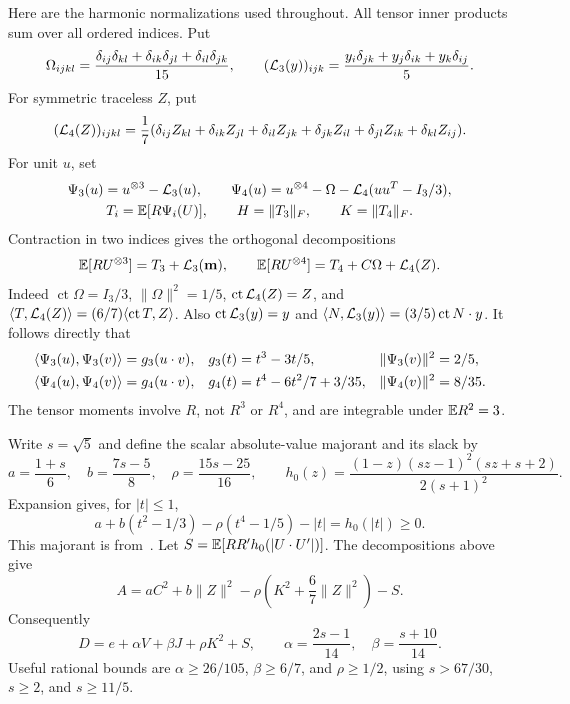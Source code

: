 Here are the harmonic normalizations used throughout. All tensor inner
products sum over all ordered indices. Put
\[
 \Omega_{ijkl}=\frac{\delta_{ij}\delta_{kl}+\delta_{ik}\delta_{jl}
                           +\delta_{il}\delta_{jk}}{15},
 \qquad
 ({\cal L}_3(y))_{ijk}
       =\frac{y_i\delta_{jk}+y_j\delta_{ik}+y_k\delta_{ij}}5.
\]
For symmetric traceless $Z$, put
\[
 ({\cal L}_4(Z))_{ijkl}=\frac17(\delta_{ij}Z_{kl}+\delta_{ik}Z_{jl}
 +\delta_{il}Z_{jk}+\delta_{jk}Z_{il}+\delta_{jl}Z_{ik}+\delta_{kl}Z_{ij}).
\]
For unit $u$, set
\[
 \begin{gathered}
 \Psi_3(u)=u^{\otimes3}-{\cal L}_3(u),\qquad
 \Psi_4(u)=u^{\otimes4}-\Omega-{\cal L}_4(uu^T-I_3/3),\\
 T_i=\mathbb E[R\Psi_i(U)],\qquad H=\|T_3\|_F,\qquad K=\|T_4\|_F.
 \end{gathered}
\]
Contraction in two indices gives the orthogonal decompositions
\[
 \mathbb E[R U^{\otimes3}]=T_3+{\cal L}_3(\mathbf m),\qquad
 \mathbb E[R U^{\otimes4}]=T_4+C\Omega+{\cal L}_4(Z).
\]
Indeed $\operatorname{ct}\Omega=I_3/3$, $\|\Omega\|^2=1/5$,
$\operatorname{ct}{\cal L}_4(Z)=Z$, and
$\langle T,{\cal L}_4(Z)\rangle=(6/7)\langle\operatorname{ct}T,Z\rangle$.
Also $\operatorname{ct}{\cal L}_3(y)=y$ and
$\langle N,{\cal L}_3(y)\rangle=(3/5)\operatorname{ct}N\cdot y$.
It follows directly that
\begin{align}\label{harmonics}
 \langle\Psi_3(u),\Psi_3(v)\rangle&=g_3(u\cdot v),&
 g_3(t)&=t^3-3t/5,&\|\Psi_3(v)\|^2&=2/5,\notag\\
 \langle\Psi_4(u),\Psi_4(v)\rangle&=g_4(u\cdot v),&
 g_4(t)&=t^4-6t^2/7+3/35,&\|\Psi_4(v)\|^2&=8/35.
\end{align}
The tensor moments involve $R$, not $R^3$ or $R^4$, and are integrable
under $\mathbb E R^2=3$.

Write $s=\sqrt5$ and define the scalar absolute-value majorant and its slack by
\[
 a=\frac{1+s}{6},\quad b=\frac{7s-5}{8},\quad\rho=\frac{15s-25}{16},
 \qquad h_0(z)=\frac{(1-z)(sz-1)^2(sz+s+2)}{2(s+1)^2}.
\]
Expansion gives, for $|t|\le1$,
\[
 a+b(t^2-1/3)-\rho(t^4-1/5)-|t|=h_0(|t|)\ge0.
\]
This majorant is from~\cite[Lemma 4.4]{STW}.
Let $S=\mathbb E[RR'h_0(|U\cdot U'|)]$. The decompositions above give
\[
 A=aC^2+b\|Z\|^2-\rho\left(K^2+\frac67\|Z\|^2\right)-S.
\]
Consequently
\begin{equation}\label{budget4}
 D=e+\alpha V+\beta J+\rho K^2+S,
 \qquad \alpha=\frac{2s-1}{14},\quad\beta=\frac{s+10}{14}.
\end{equation}
Useful rational bounds are $\alpha\ge26/105$, $\beta\ge6/7$,
and $\rho\ge1/2$, using $s>67/30$, $s\ge2$, and $s\ge11/5$.
